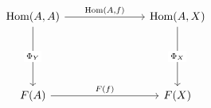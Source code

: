 \[\begin{tikzcd}
	{\text{Hom}(A,A)} &&& {\text{Hom}(A,X)} \\
	\\
	\\
	{F(A)} &&& {F(X)}
	\arrow["{\text{Hom}(A,f)}", from=1-1, to=1-4]
	\arrow["{\Phi_Y}"{description}, from=1-1, to=4-1]
	\arrow["{\Phi_X}"{description}, from=1-4, to=4-4]
	\arrow["{F(f)}", from=4-1, to=4-4]
\end{tikzcd}\]
